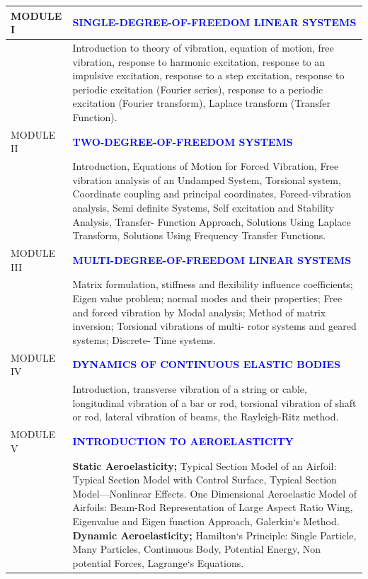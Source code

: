 \documentclass[11pt]{exam}
\begin{document}
\begin{longtable}{|>{\centering\arraybackslash}p{2.5cm}  | >{\raggedright\arraybackslash}p{13.6cm}  | }
		\hline 
		MODULE I & \textcolor{blue}{\textbf{SINGLE-DEGREE-OF-FREEDOM LINEAR SYSTEMS}}\\
		\hline
		& Introduction to theory of vibration, equation of motion, free vibration, response to harmonic excitation, response to an		impulsive excitation, response to a step excitation, response to periodic excitation (Fourier series), response to a periodic		excitation (Fourier transform), Laplace transform (Transfer Function). \\
		\hline
		MODULE II & \textcolor{blue}{\textbf{TWO-DEGREE-OF-FREEDOM SYSTEMS}}\\
		\hline
		& Introduction, Equations of Motion for Forced Vibration, Free vibration analysis of an Undamped System, Torsional system, Coordinate coupling and principal coordinates, Forced-vibration analysis, Semi definite Systems, Self excitation and Stability Analysis, Transfer- Function Approach, Solutions Using Laplace Transform, Solutions Using
		Frequency Transfer Functions. \\
		\hline
		MODULE III & \textcolor{blue}{\textbf{MULTI-DEGREE-OF-FREEDOM LINEAR SYSTEMS}}\\
		\hline
		& Matrix formulation, stiffness and flexibility influence coefficients; Eigen value problem; normal modes and their		properties; Free and forced vibration by Modal analysis;
		Method of matrix inversion; Torsional vibrations of multi- rotor systems and geared systems; Discrete- Time systems.\\
		\hline
		MODULE IV & \textcolor{blue}{\textbf{DYNAMICS OF CONTINUOUS ELASTIC BODIES}}\\
		\hline
		& Introduction, transverse vibration of a string or cable, longitudinal vibration of a bar or rod, torsional vibration of shaft or rod, lateral vibration of beams, the Rayleigh-Ritz method.\\
		\hline
		MODULE V & \textcolor{blue}{\textbf{INTRODUCTION TO AEROELASTICITY}}\\
		\hline
		& \textbf{Static Aeroelasticity;} Typical Section Model of an Airfoil: Typical Section Model with Control Surface, Typical Section Model—Nonlinear Effects. One Dimensional Aeroelastic Model of Airfoils: Beam-Rod Representation of Large Aspect Ratio Wing, Eigenvalue and Eigen function Approach, Galerkin‘s Method. 
\newline\textbf{Dynamic Aeroelasticity;} Hamilton‘s Principle: Single Particle, Many Particles, Continuous Body, Potential Energy, Non potential Forces, Lagrange‘s Equations. \\
		\hline
	\end{longtable}
\end{document}
